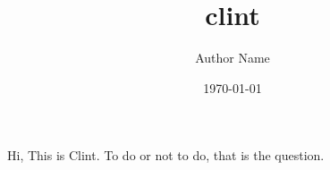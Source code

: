 \documentclass{article}
\title{clint}
\author{Author Name}
\date{\today}
\begin{document}
\maketitle

Hi, This is Clint. To do or not to do, that is the question.
\end{document}
